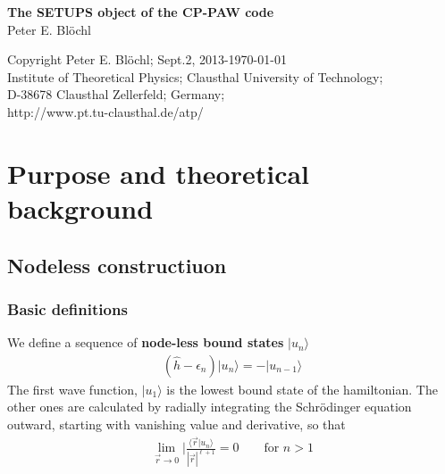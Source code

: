 \documentclass[11pt,a4paper]{report}
\begin{document}
\begin{titlepage}
\begin{center}
\vspace*{3.5cm}
{\huge \textbf{The SETUPS object of the CP-PAW code}}\\
\vspace{0.5cm}
{\large Peter E. Bl\"ochl}
\vspace{0.5cm} 
\end{center}

\vfill
\begin{center}
Copyright Peter E. Bl\"ochl; Sept.2, 2013-\today\\
{\small
Institute of Theoretical Physics;
Clausthal University of Technology;\\ 
D-38678 Clausthal Zellerfeld; Germany;\\
http://www.pt.tu-clausthal.de/atp/}
\end{center}
\end{titlepage}
\noindent            
\tableofcontents
\chapter{Purpose and theoretical background}
\section{Nodeless constructiuon}
\subsection{Basic definitions}
We define\cite{bloechl12_arxiv1210_5937} a sequence of
\textbf{node-less bound states}
$|u_n\rangle$
\begin{eqnarray}
(\hat{h}-\epsilon_n)|u_n\rangle=-|u_{n-1}\rangle
\end{eqnarray}
The first wave function, $|u_1\rangle$ is the lowest bound state of
the hamiltonian. The other ones are calculated by radially integrating
the Schr\"odinger equation outward, starting with vanishing value and
derivative, so that
\begin{eqnarray}
\lim_{\vec{r}\rightarrow0}|\frac{\langle\vec{r}|u_n\rangle}{|\vec{r}|^{\ell+1}}=0
\qquad\text{for $n>1$}
\end{eqnarray}
\end{document}
